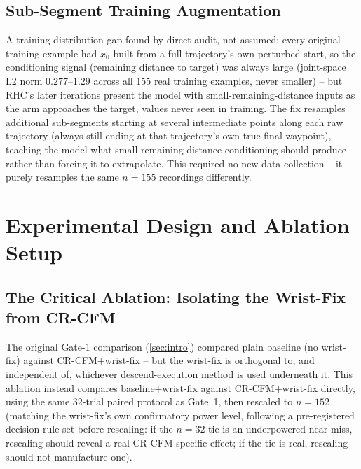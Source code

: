 \documentclass[]{interact}
\begin{document}
\subsection{Sub-Segment Training Augmentation}
A training-distribution gap found by direct audit, not assumed: every original training example
had $x_0$ built from a full trajectory's own perturbed start, so the conditioning signal
(remaining distance to target) was always large (joint-space L2 norm $0.277$--$1.29$ across all
155 real training examples, never smaller) -- but RHC's later iterations present the model with
small-remaining-distance inputs as the arm approaches the target, values never seen in training.
The fix resamples additional sub-segments starting at several intermediate points along each raw
trajectory (always still ending at that trajectory's own true final waypoint), teaching the model
what small-remaining-distance conditioning should produce rather than forcing it to extrapolate.
This required no new data collection -- it purely resamples the same $n{=}155$ recordings
differently.

\section{Experimental Design and Ablation Setup}

\subsection{The Critical Ablation: Isolating the Wrist-Fix from CR-CFM}
The original Gate-1 comparison (\cref{sec:intro}) compared plain baseline (no wrist-fix) against
CR-CFM+wrist-fix -- but the wrist-fix is orthogonal to, and independent of, whichever
descend-execution method is used underneath it. This ablation instead compares baseline+wrist-fix
against CR-CFM+wrist-fix directly, using the same 32-trial paired protocol as Gate~1, then rescaled
to $n=152$ (matching the wrist-fix's own confirmatory power level, following a pre-registered
decision rule set before rescaling: if the $n=32$ tie is an underpowered near-miss, rescaling should
reveal a real CR-CFM-specific effect; if the tie is real, rescaling should not manufacture one).
\end{document}
